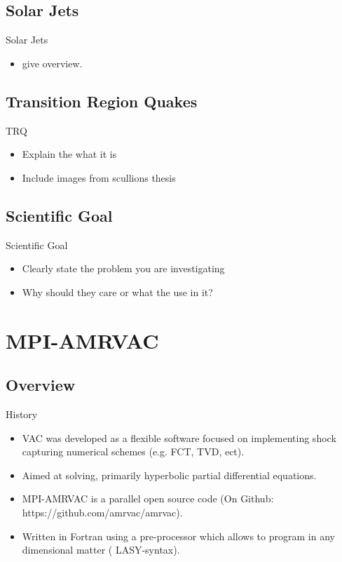 \documentclass{beamer}
\begin{document}
\subsection{Solar Jets}
\begin{frame}{Solar Jets}
\begin{itemize}
\item give overview.
\end{itemize}
\end{frame}
\subsection{Transition Region Quakes} %
\begin{frame}
\begin{block}{TRQ}
\begin{itemize}
\item Explain the what it is
\item Include images from scullions thesis
\end{itemize}
\end{block}
\end{frame}
\subsection{Scientific Goal}
\begin{frame}{Scientific Goal}
\begin{itemize}
\item Clearly state the problem you are investigating
\item Why should they care or what the use in it?
\end{itemize}
\end{frame}
\section{MPI-AMRVAC}
\subsection{Overview}
\begin{frame}
\begin{block}{History}
\begin{itemize}
\item VAC was developed as a flexible software focused on implementing shock capturing numerical schemes (e.g. FCT, TVD, ect). 
\item Aimed at solving, primarily hyperbolic partial differential equations.  
\item MPI-AMRVAC is a parallel open source code (On Github: https://github.com/amrvac/amrvac).   
\item Written in Fortran using a pre-processor which allows to program in any dimensional matter ( LASY-syntax).  
\end{itemize}
\end{block}
\end{frame}
\end{document}
